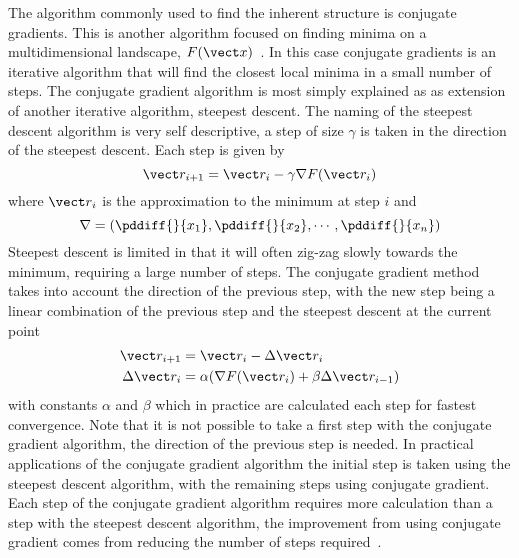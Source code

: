 The algorithm commonly used to find the inherent structure is conjugate gradients\tocite. This is another algorithm focused on finding minima on a multidimensional landscape, $F(\vect x)$~\cite{shewchuk:94,hestenes:52}. In this case conjugate gradients is an iterative algorithm that will find the closest local minima in a small number of steps. The conjugate gradient algorithm is most simply explained as as extension of another iterative algorithm, steepest descent. The naming of the steepest descent algorithm is very self descriptive, a step of size $\gamma$ is taken in the direction of the steepest descent. Each step is given by
\begin{equation}
    \vect r_{i+1} = \vect r_i - \gamma \nabla F(\vect r_i)
\end{equation}
where $\vect r_i$ is the approximation to the minimum at step $i$ and
\begin{equation}
    \nabla = \left (\pddiff{}{x_1}, \pddiff{}{x_2},\cdots,\pddiff{}{x_n} \right )
\end{equation}
Steepest descent is limited in that it will often zig-zag slowly towards the minimum, requiring a large number of steps. The conjugate gradient method takes into account the direction of the previous step, with the new step being a linear combination of the previous step and the steepest descent at the current point
\begin{align}
    \vect r_{i+1} &= \vect r_{i} - \Delta \vect r_i \\
     \Delta \vect r_{i} &= \alpha( \nabla F(\vect r_i) + \beta \Delta \vect r_{i-1})
\end{align}
with constants $\alpha$ and $\beta$ which in practice are calculated each step for fastest convergence. Note that it is not possible to take a first step with the conjugate gradient algorithm, the direction of the previous step is needed. In practical applications of the conjugate gradient algorithm the initial step is taken using the steepest descent algorithm, with the remaining steps using conjugate gradient. Each step of the conjugate gradient algorithm requires more calculation than a step with the steepest descent algorithm, the improvement from using conjugate gradient comes from reducing the number of steps required~\cite{knyazev:08}.
